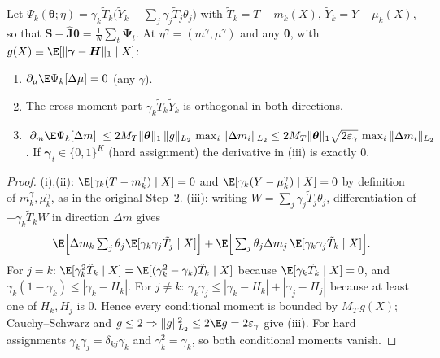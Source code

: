 \begin{lemma}
\label{lem:orth}
Let $\Psi_{k}(\boldsymbol\theta;\eta)=\gamma_k\tilde T_k\big(\tilde Y_k-\sum_{j}\gamma_j\tilde T_j\theta_j\big)$ with
$\tilde T_k=T-m_k(X)$, $\tilde Y_k=Y-\mu_k(X)$, so that $\hat{\boldsymbol S}-\hat{\boldsymbol J}\boldsymbol\theta=\frac1N\sum_t\boldsymbol\Psi_t$.
At $\eta^\gamma=(m^\gamma,\mu^\gamma)$ and any $\boldsymbol\theta$, with $g(X)\equiv\E[\|\boldsymbol\gamma-\boldsymbol H\|_1\mid X]$:
\begin{enumerate}\setlength{\itemsep}{0pt}\setlength{\parskip}{0pt}
\item[(i)] $\partial_\mu\E\Psi_k[\Delta\mu]=0$ (any $\gamma$).
\item[(ii)] The cross-moment part $\gamma_k\tilde T_k\tilde Y_k$ is orthogonal in both directions.
\item[(iii)] $|\partial_m\E\Psi_k[\Delta m]|\le 2M_T\|\boldsymbol\theta\|_1\,\|g\|_{L_2}\,\max_i\|\Delta m_i\|_{L_2}\le 2M_T\|\boldsymbol\theta\|_1\sqrt{2\varepsilon_\gamma}\,\max_i\|\Delta m_i\|_{L_2}$.
If $\boldsymbol\gamma_t\in\{0,1\}^K$ (hard assignment) the derivative in (iii) is exactly $0$.
\end{enumerate}
\end{lemma}
\begin{proof}
(i),(ii): $\E[\gamma_k(T-m_k^\gamma)\mid X]=0$ and $\E[\gamma_k(Y-\mu_k^\gamma)\mid X]=0$ by definition of $m_k^\gamma,\mu_k^\gamma$, as in the original Step~2.
(iii): writing $W=\sum_j\gamma_j\tilde T_j\theta_j$, differentiation of $-\gamma_k\tilde T_kW$ in direction $\Delta m$ gives
\[
\E\Big[\Delta m_k\textstyle\sum_j\theta_j\E[\gamma_k\gamma_j\tilde T_j\mid X]\Big]+\E\Big[\textstyle\sum_j\theta_j\Delta m_j\,\E[\gamma_k\gamma_j\tilde T_k\mid X]\Big].
\]
For $j=k$: $\E[\gamma_k^2\tilde T_k\mid X]=\E[(\gamma_k^2-\gamma_k)\tilde T_k\mid X]$ because $\E[\gamma_k\tilde T_k\mid X]=0$, and
$\gamma_k(1-\gamma_k)\le|\gamma_k-H_k|$. For $j\neq k$: $\gamma_k\gamma_j\le|\gamma_k-H_k|+|\gamma_j-H_j|$ because at least one of $H_k,H_j$ is $0$.
Hence every conditional moment is bounded by $M_T\,g(X)$; Cauchy--Schwarz and $g\le2\Rightarrow\|g\|_{L_2}^2\le2\E g=2\varepsilon_\gamma$ give (iii).
For hard assignments $\gamma_k\gamma_j=\delta_{kj}\gamma_k$ and $\gamma_k^2=\gamma_k$, so both conditional moments vanish.
\end{proof}

